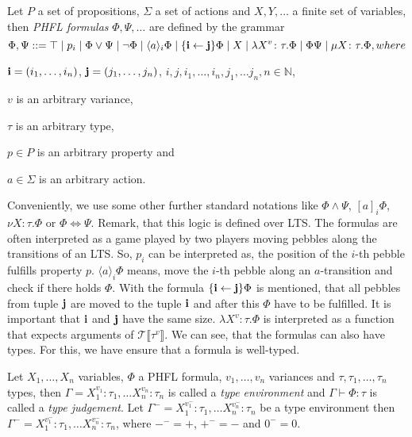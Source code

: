 \begin{definition}
    Let $P$ a set of propositions, $\Sigma$ a set of actions and $X, Y, \dots$ a finite set
    of variables, then
    \emph{PHFL formulas} $\Phi, \Psi,\dots$ are defined by the grammar
    \[\Phi,\Psi::=\top \mid p_i \mid \Phi \vee \Psi \mid \neg \Phi \mid \langle a \rangle_i \Phi \mid \{\emph{i}
    \leftarrow \emph{j}\} \Phi \mid X \mid \lambda X^v\colon\tau.\Phi \mid \Phi \Psi \mid \mu X\colon\tau.\Phi,
    where\]
    \begin{compactitem}
        \item $\emph{i} = (i_1,\dots, i_n)$, $\emph{j} = (j_1,\dots,j_n)$, $i, j, i_1,\dots,i_n, j_1, \dots j_n, n\in
        \mathbb{N}$,
        \item $v$ is an arbitrary variance,
        \item $\tau$ is an arbitrary type,
        \item $p \in P$ is an arbitrary property and
        \item $a \in \Sigma$ is an arbitrary action.
    \end{compactitem}
\end{definition}

Conveniently, we use some other further standard notations like $\Phi \wedge \Psi$, $[a]_i\Phi$, $\nu
X \colon \tau.\Phi$ or $\Phi \Leftrightarrow \Psi$. Remark, that this logic is defined over LTS. The formulas are
often interpreted as a game played by two players  moving pebbles along the transitions of an LTS. So, $p_i$ can be
interpreted as, the position of the $i$-th pebble fulfills property $p$. $\langle a \rangle_i \Phi$ means, move the
$i$-th pebble along an $a$-transition and check if there holds $\Phi$. With the formula $\{\emph{i}\leftarrow
\emph{j}\} \Phi$ is mentioned, that all pebbles from tuple $\emph{j}$ are moved to the tuple $\emph{i}$ and after
this $\Phi$ have to be fulfilled. It is important that $\emph{i}$ and $\emph{j}$ have the same size. $\lambda
X^v\colon\tau.\Phi$ is interpreted as a function that expects arguments of
$\mathcal{T}\llbracket\tau^v\rrbracket$. We can see, that the formulas can also have types. For this, we have
ensure that a formula is well-typed.

\begin{definition}
    Let $X_1, \dots, X_n$ variables, $\Phi$ a PHFL formula, $v_1, \dots, v_n$ variances and $\tau, \tau_1, \dots,
    \tau_n$ types, then $\Gamma = X_1^{v_1}\colon \tau_1, \dots X_n^{v_n} \colon \tau_n$ is
    called a \emph{type environment} and $\Gamma \vdash \Phi:\tau$
    is called a \emph{type judgement}. Let $\Gamma^- = X_1^{v_1^-}\colon \tau_1, \dots
    X_n^{v_n^-} \colon \tau_n$ be a type environment then $\Gamma^- = X_1^{v_1^-}\colon \tau_1, \dots
    X_n^{v_n^-} \colon \tau_n$, where $-^- = +$, $+^- = -$ and $0^- = 0$.
\end{definition}

